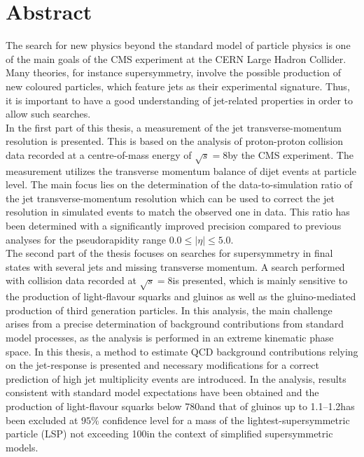 \section*{Abstract}
The search for new physics beyond the standard model of particle physics is one of the main goals of the CMS experiment at the CERN Large Hadron Collider. Many theories, for instance supersymmetry, involve the possible production of new coloured particles, which feature jets as their experimental signature. Thus, it is important to have a good understanding of jet-related properties in order to allow such searches.\\
In the first part of this thesis, a measurement of the jet transverse-momentum resolution is presented. This is based on the analysis of proton-proton collision data recorded at a centre-of-mass energy of $\sqrt{s}=8$\tev by the CMS experiment. The measurement utilizes the transverse momentum balance of dijet events at particle level. The main focus lies on the determination of the data-to-simulation ratio of the jet transverse-momentum resolution which can be used to correct the jet resolution in simulated events to match the observed one in data. This ratio has been determined with a significantly improved precision compared to previous analyses for the pseudorapidity range $0.0 \leq |\eta| \leq 5.0$. \\ 
The second part of the thesis focuses on searches for supersymmetry in final states with several jets and missing transverse momentum. A search performed with collision data recorded at $\sqrt{s}=8$\tev is presented, which is mainly sensitive to the production of light-flavour squarks and gluinos as well as the gluino-mediated production of third generation particles. In this analysis, the main challenge arises from a precise determination of background contributions from standard model processes, as the analysis is performed in an extreme kinematic phase space. In this thesis, a method to estimate QCD background contributions relying on the jet-\pt response is presented and necessary modifications for a correct prediction of high jet multiplicity events are introduced. In the analysis, results consistent with standard model expectations have been obtained and the production of light-flavour squarks below 780\gev and that of gluinos up to 1.1--1.2\tev has been excluded at $95\%$ confidence level for a mass of the lightest-supersymmetric particle (LSP) not exceeding 100\gev in the context of simplified supersymmetric models. \\
